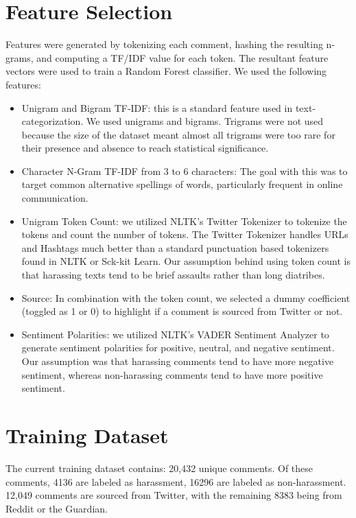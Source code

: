 \documentclass[11pt,a4paper]{article}
\begin{document}
\section{Feature Selection}
Features were generated by tokenizing each comment,
hashing the resulting n-grams, and computing
a TF/IDF value for each token. The resultant
feature vectors were used to train a Random Forest
classifier. We used the following features:

\begin{itemize}
\item Unigram and Bigram TF-IDF: this is a
standard feature used in text-categorization.
We used unigrams and bigrams. Trigrams
were not used because the size of the dataset
meant almost all trigrams were too rare for
their presence and absence to reach statistical
significance.
\item Character N-Gram TF-IDF from 3 to 6
characters: The goal with this was to target
common alternative spellings of words, particularly
frequent in online communication.
\item Unigram Token Count: we utilized
NLTK’s Twitter Tokenizer to tokenize the
tokens and count the number of tokens. The
Twitter Tokenizer handles URLs and
Hashtags much better than a standard
punctuation based tokenizers found in NLTK
or Sck-kit Learn. Our assumption behind
using token count is that harassing texts tend
to be brief assaults rather than long diatribes.
\item Source: In combination with the token
count, we selected a dummy coefficient (toggled
as 1 or 0) to highlight if a comment is
sourced from Twitter or not.
\item Sentiment Polarities: we utilized NLTK’s
VADER Sentiment Analyzer to generate sentiment
polarities for positive, neutral, and
negative sentiment. Our assumption was that
harassing comments tend to have more negative
sentiment, whereas non-harassing comments
tend to have more positive sentiment.
\end{itemize}

\section{Training Dataset}
The current training dataset contains: 20,432
unique comments. Of these comments, 4136 are labeled
as harassment, 16296 are labeled as non-harassment.
12,049 comments are sourced from Twitter,
with the remaining 8383 being from Reddit or
the Guardian.
\end{document}
